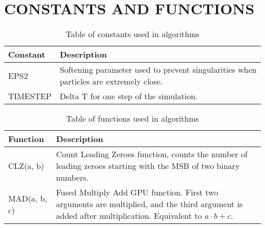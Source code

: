 \documentclass{thesis}
\begin{document}
\appendix    %
\chapter{CONSTANTS AND FUNCTIONS}
\begin{table}[!h]
    \centering
    \caption{Table of constants used in algorithms}
    \label{tab:Constants}
    \begin{tabular}{|p{3cm}|p{10cm}|}
        \hline
        Constant & Description \\
        \hline\hline
        EPS2 & Softening parameter used to prevent singularities when particles are extremely close.\\
        \hline
        TIMESTEP & Delta T for one step of the simulation.\\
        \hline
    \end{tabular}
\end{table}
\begin{table}[!h]
    \centering
    \caption{Table of functions used in algorithms}
    \label{tab:Functions}
    \begin{tabular}{|p{3cm}|p{10cm}|}
        \hline
        Function & Description \\
        \hline\hline
        CLZ(a, b) & Count Leading Zeroes function, counts the number of leading zeroes starting with the MSB of two binary numbers.\\
        \hline
        MAD(a, b, c) & Fused Multiply Add GPU function. First two arguments are multiplied, and the third argument is added after multiplication. Equivalent to $a \cdot b + c$.\\
        \hline
    \end{tabular}
\end{table}

\end{document}
